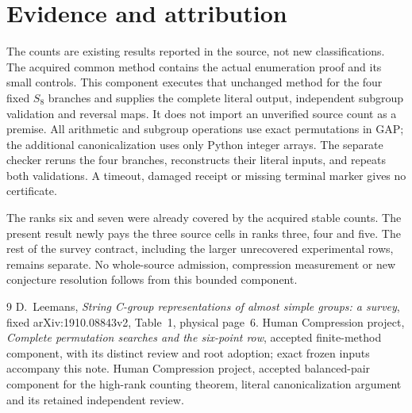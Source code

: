 \documentclass[10pt,a4paper]{article}
\begin{document}
\section*{Evidence and attribution}
The counts are existing results reported in the source, not new
classifications.  The acquired common method contains the actual
enumeration proof and its small controls.  This component executes that
unchanged method for the four fixed $S_8$ branches and supplies the
complete literal output, independent subgroup validation and reversal
maps.  It does not import an unverified source count as a premise.
All arithmetic and subgroup operations use exact permutations in GAP;
the additional canonicalization uses only Python integer arrays.
The separate checker reruns the four branches, reconstructs their
literal inputs, and repeats both validations.  A timeout, damaged
receipt or missing terminal marker gives no certificate.

The ranks six and seven were already covered by the acquired stable
counts.  The present result newly pays the three source cells in ranks
three, four and five.  The rest of the survey contract, including the
larger unrecovered experimental rows, remains separate.  No whole-source
admission, compression measurement or new conjecture resolution follows
from this bounded component.

\begin{thebibliography}{9}\small
{} D.~Leemans, \emph{String C-group representations of almost
simple groups: a survey}, fixed arXiv:1910.08843v2, Table~1, physical page~6.
 Human Compression project, \emph{Complete permutation
searches and the six-point row}, accepted finite-method component, with its
distinct review and root adoption; exact frozen inputs accompany this note.
 Human Compression project, accepted balanced-pair
component for the high-rank counting theorem, literal canonicalization
argument and its retained independent review.
\end{thebibliography}
\end{document}
